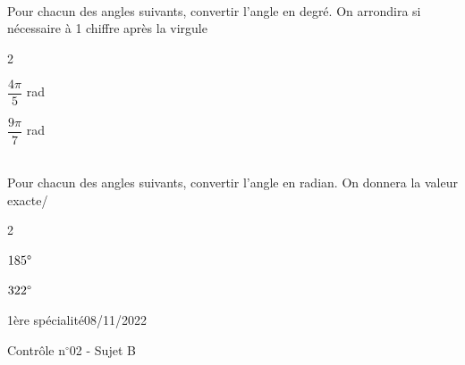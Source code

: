 \documentclass[a4paper,12pt]{article}        %
\begin{document}
\\
Pour chacun des angles suivants, convertir l'angle en degré. On arrondira si nécessaire à 1 chiffre après la virgule
\begin{multicols}{2}
	\begin{enumMet}
		\item $\dfrac{4\pi}{5}$ rad
		\item $\dfrac{9\pi}{7}$ rad
	\end{enumMet}
\end{multicols}

\\
Pour chacun des angles suivants, convertir l'angle en radian. On donnera la valeur exacte/
\begin{multicols}{2}
	\begin{enumMet}
		\item $185\degree$
		\item $322\degree$
	\end{enumMet}
\end{multicols}


\newpage
\vspace*{-1.5cm}
1ère spécialité\phantom{xxxxxxxxxxxxxxxxxxxxxxxxxxxxxxxxxxxxxxxxxxxxxxxxxxxxxxxxxxxxxxx}08/11/2022
{\begin{center}\Huge{Contrôle n$^{\circ}$02 - Sujet B}\end{center}}

\setcounter{exo}{1}
\end{document}
